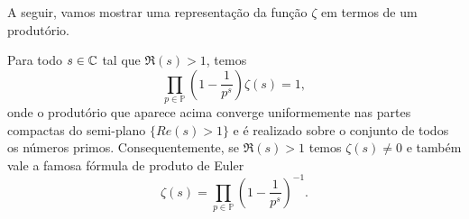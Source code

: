     A seguir, vamos mostrar uma representação da função $\zeta$
    em termos de um produtório.
    \begin{teorema}
    \label{teo-form-prod-euler}
        Para todo $s\in\mathbb{C}$ tal que $\Re(s) > 1$, temos
        \[
        \prod_{p\in\mathbb{P}} 
        \left(1 - \frac{1}{p^s} \right)
        \zeta(s) 
        =
        1,
        \]
        onde o produtório que aparece acima converge uniformemente nas
        partes compactas do semi-plano $\{Re(s)>1\}$ e é realizado sobre o conjunto de todos os números primos. Consequentemente, 
        se $\Re(s)>1$ temos $\zeta(s)\neq 0$ e 
        também vale a famosa fórmula de produto de Euler 
        \[
        \zeta(s) 
        =
        \prod_{p\in\mathbb{P}} 
        \left(1 - \frac{1}{p^s} \right)^{-1}.
        \]
    \end{teorema}
